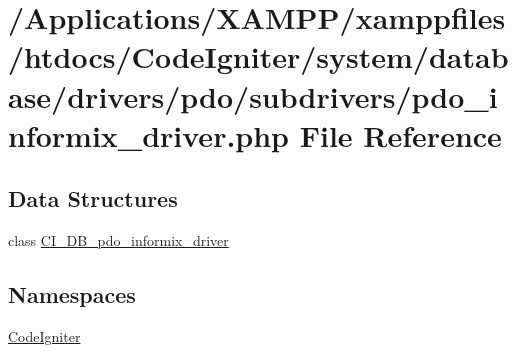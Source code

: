 \hypertarget{pdo__informix__driver_8php}{}\section{/\+Applications/\+X\+A\+M\+P\+P/xamppfiles/htdocs/\+Code\+Igniter/system/database/drivers/pdo/subdrivers/pdo\+\_\+informix\+\_\+driver.php File Reference}
\label{pdo__informix__driver_8php}
\subsection*{Data Structures}
\begin{DoxyCompactItemize}
\item 
class \mbox{\hyperlink{class_c_i___d_b__pdo__informix__driver}{C\+I\+\_\+\+D\+B\+\_\+pdo\+\_\+informix\+\_\+driver}}
\end{DoxyCompactItemize}
\subsection*{Namespaces}
\begin{DoxyCompactItemize}
\item 
 \mbox{\hyperlink{namespace_code_igniter}{Code\+Igniter}}
\end{DoxyCompactItemize}
